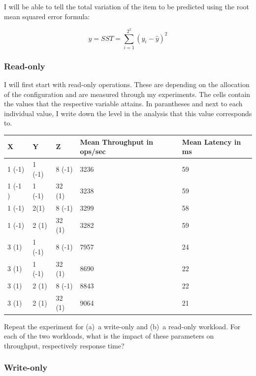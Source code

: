 \documentclass[11pt,a4paper]{article}
\begin{document}
I will be able to tell the total variation of the item to be predicted using the root mean squared error formula:
 
\begin{equation}
y = SST = \sum_{i=1}^{2^2} (y_i - \hat{y} )^2
\end{equation}


\subsubsection{Read-only}

I will first start with read-only operations.
These are depending on the allocation of the configuration and are measured through my experiments.
The cells contain the values that the respective variable attains.
In parantheses and next to each individual value, I write down the level in the analysis that this value corresponds to.


\begin{center}
    \begin{tabular}{ | l | l | l | l | l | }
    \hline
    X & Y & Z & Mean Throughput in ops/sec & Mean Latency in ms\\ \hline
    1 (-1) & 1 (-1) & 8 (-1) & 3236 & 59 \\ \hline
    1 (-1 )& 1 (-1) & 32 (1) & 3238 & 59 \\ \hline
    1 (-1) & 2(1)  & 8 (-1) & 3299 & 58 \\ \hline
   	1 (-1) & 2 (1) & 32 (1) & 3282 & 59 \\ \hline
    3 (1) & 1 (-1) & 8 (-1) & 7957 & 24 \\ \hline
    3 (1) & 1 (-1) & 32 (1) & 8690 & 22 \\ \hline
    3 (1) & 2 (1) & 8 (-1) & 8843 & 22 \\ \hline
    3 (1) & 2 (1) & 32 (1) & 9064 & 21 \\
    \hline
    \end{tabular}
\end{center}

Repeat the experiment for (a)~a write-only and (b)~a read-only workload.
For each of the two workloads, what is the impact of these parameters on throughput, respectively response time?




\subsubsection{Write-only}
\end{document}
